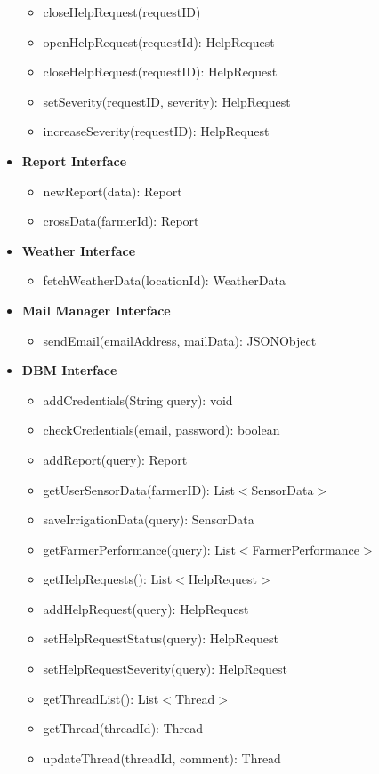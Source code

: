 \documentclass[10pt]{article} %
\begin{document}
\begin{itemize}
\begin{itemize}
        \item closeHelpRequest(requestID)
        \item openHelpRequest(requestId): HelpRequest
        \item closeHelpRequest(requestID): HelpRequest
        \item setSeverity(requestID, severity): HelpRequest
        \item increaseSeverity(requestID): HelpRequest
    \end{itemize}
    \item \textbf{Report Interface}
    \begin{itemize}
        \item newReport(data): Report
        \item crossData(farmerId): Report
    \end{itemize}
    \item \textbf{Weather Interface}
    \begin{itemize}
        \item fetchWeatherData(locationId): WeatherData
    \end{itemize}
    \item \textbf{Mail Manager Interface}
    \begin{itemize}
        \item sendEmail(emailAddress, mailData): JSONObject
    \end{itemize}
    \item \textbf{DBM Interface}
    \begin{itemize}
        \item addCredentials(String query): void
        \item checkCredentials(email, password): boolean
        \item addReport(query): Report
        \item getUserSensorData(farmerID): List$<$SensorData$>$
        \item saveIrrigationData(query): SensorData
        \item getFarmerPerformance(query): List$<$FarmerPerformance$>$
        \item getHelpRequests(): List$<$HelpRequest$>$
        \item addHelpRequest(query): HelpRequest
        \item setHelpRequestStatus(query): HelpRequest
        \item setHelpRequestSeverity(query): HelpRequest
        \item getThreadList(): List$<$Thread$>$
        \item getThread(threadId): Thread
        \item updateThread(threadId, comment): Thread
    \end{itemize}
\end{itemize}
\end{document}
